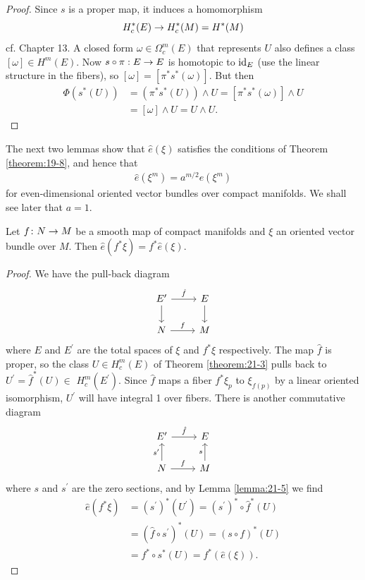 \begin{proof}
  Since $s$ is a proper map, it induces a homomorphism
  \[
    H_c^*( E)  \rightarrow  H_c^*( M)  = {H}^*( M)
  \]
  cf. Chapter 13. A closed form $\omega  \in  {\Omega }_{c}^{m}( E)$ that represents $U$ also defines 
  a class $[  \omega ]   \in  H^m( E)$. Now $s \circ  \pi  : E \rightarrow  E$ is 
  homotopic to ${\mathrm{id}}_{E}$ (use the linear structure in the fibers), so $[\omega] = [  {{\pi }^*{s}^*( \omega ) }]$. 
  But then
  \begin{align*}
      \Phi ( {{s}^*( U) })  
      & = ( {{\pi }^*{s}^*( U) })  \land  U = [  {{\pi }^*{s}^*( \omega ) }] \land  U \\
      & = [  \omega ]   \land  U = U \land  U\text{. }
  \end{align*}
\end{proof}

The next two lemmas show that $\hat{e}( \xi )$ satisfies the conditions of Theorem \ref{theorem:19-8}, 
and hence that
\begin{align}\label{eq:21-3}
  \hat{e}( {\xi }^{m})  = {a}^{m/2}e( {\xi }^{m})
\end{align}
for even-dimensional oriented vector bundles over compact manifolds. We shall see later that $a = 1$.

\begin{lemma}\label{lemma:21-6}
  Let $f\colon N \rightarrow  M$ be a smooth map of compact manifolds and $\xi$ an oriented vector bundle 
  over $M$. Then $\hat{e}( {{f}^*\xi })  = {f}^*\hat{e}( \xi )$.
\end{lemma}

\begin{proof}
  We have the pull-back diagram
  \[\begin{tikzcd}
    E'\rar{\hat f}\dar{} & E\dar{} \\
    N\rar{f} & M
  \end{tikzcd}\]
  where $E$ and ${E}^{\prime }$ are the total spaces of $\xi$ and ${f}^*\xi$ respectively. 
  The map $\hat{f}$ is proper, so the class $U \in  H_c^{m}( E)$ of Theorem \ref{theorem:21-3} pulls 
  back to ${U}^{\prime } = {\hat{f}}^*( U)  \in$  $H_c^{m}( {E}^{\prime })$. Since $\hat{f}$ maps 
  a fiber ${f}^*{\xi }_{p}$ to ${\xi }_{f( p) }$ by a linear oriented isomorphism, ${U}^{\prime }$ will 
  have integral 1 over fibers. There is another commutative diagram
  \[\begin{tikzcd}
    E'\rar{\hat f} & E \\
    N\rar{f}\uar{s'} & M\uar{s}
  \end{tikzcd}\]
  where $s$ and ${s}^{\prime }$ are the zero sections, and by Lemma \ref{lemma:21-5} we find
    \begin{align*}
      \hat{e}( {{f}^*\xi })  
      & = {( {s}^{\prime }) }^*( {U}^{\prime })  
        = {( {s}^{\prime }) }^* \circ  {\hat{f}}^*( U) \\
      & = {( \hat{f} \circ  {s}^{\prime }) }^*( U)  
        = {( s \circ  f) }^*( U) \\
      & = {f}^* \circ  {s}^*( U)  = {f}^*( {\hat{e}( \xi ) }).
    \end{align*}
\end{proof}

